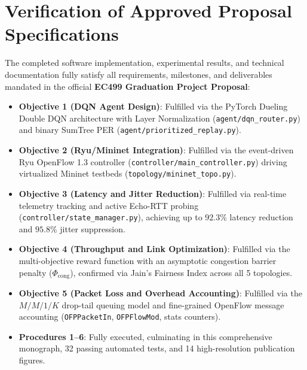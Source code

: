 \documentclass[12pt,a4paper,oneside]{report}
\begin{document}
\section{Verification of Approved Proposal Specifications}
The completed software implementation, experimental results, and technical documentation fully satisfy all requirements, milestones, and deliverables mandated in the official \textbf{EC499 Graduation Project Proposal}:
\begin{itemize}
    \item \textbf{Objective 1 (DQN Agent Design)}: Fulfilled via the PyTorch Dueling Double DQN architecture with Layer Normalization (\texttt{agent/dqn\_router.py}) and binary SumTree PER (\texttt{agent/prioritized\_replay.py}).
    \item \textbf{Objective 2 (Ryu/Mininet Integration)}: Fulfilled via the event-driven Ryu OpenFlow 1.3 controller (\texttt{controller/main\_controller.py}) driving virtualized Mininet testbeds (\texttt{topology/mininet\_topo.py}).
    \item \textbf{Objective 3 (Latency and Jitter Reduction)}: Fulfilled via real-time telemetry tracking and active Echo-RTT probing (\texttt{controller/state\_manager.py}), achieving up to $92.3\%$ latency reduction and $95.8\%$ jitter suppression.
    \item \textbf{Objective 4 (Throughput and Link Optimization)}: Fulfilled via the multi-objective reward function with an asymptotic congestion barrier penalty ($\Phi_{\text{cong}}$), confirmed via Jain's Fairness Index across all 5 topologies.
    \item \textbf{Objective 5 (Packet Loss and Overhead Accounting)}: Fulfilled via the $M/M/1/K$ drop-tail queuing model and fine-grained OpenFlow message accounting (\texttt{OFPPacketIn}, \texttt{OFPFlowMod}, stats counters).
    \item \textbf{Procedures 1--6}: Fully executed, culminating in this comprehensive monograph, 32 passing automated tests, and 14 high-resolution publication figures.
\end{itemize}
\end{document}
